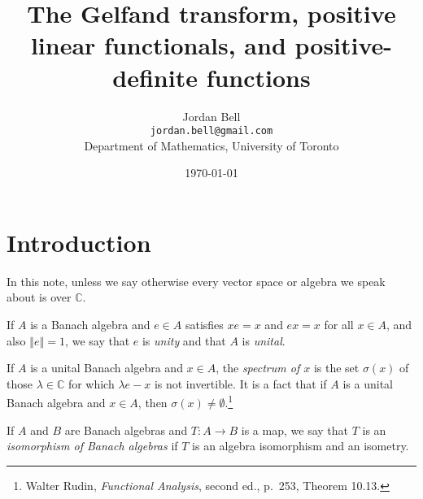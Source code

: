 \documentclass{article}
\newcommand{\norm}[1]{\left\Vert #1 \right\Vert}
\theoremstyle{definition}
\begin{document}
\title{The Gelfand transform,  positive linear functionals, and positive-definite functions}
\author{Jordan Bell\\ \texttt{jordan.bell@gmail.com}\\Department of Mathematics, University of Toronto}
\date{\today}

\maketitle

\section{Introduction}
In this note, unless we say otherwise every vector space or algebra we speak about is over $\mathbb{C}$.

If $A$ is a Banach algebra and $e \in A$ satisfies $xe=x$ and $ex=x$ for all $x \in A$, and also $\norm{e}=1$, we say that $e$ is {\em unity} and  that
$A$ is {\em unital}.

If $A$ is a unital Banach algebra  and $x \in A$, the {\em spectrum of $x$} is the set $\sigma(x)$ of those $\lambda \in \mathbb{C}$
for which $\lambda e-x$ is not invertible. It is a fact that if $A$ is a unital Banach algebra and $x \in A$, then $\sigma(x) \neq \emptyset$.\footnote{Walter
Rudin, {\em Functional Analysis}, second ed., p.~253, Theorem 10.13.}


If $A$ and $B$ are Banach algebras and
$T:A \to B$ is a map, we say that $T$ is an {\em isomorphism of Banach algebras} if $T$ is an algebra isomorphism and an isometry.
\end{document}
